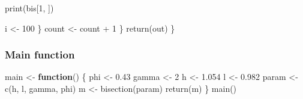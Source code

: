 \documentclass[
]{article}
\newenvironment{Shaded}{\begin{snugshade}}{\end{snugshade}}
\newcommand{\ControlFlowTok}[1]{\textcolor[rgb]{0.13,0.29,0.53}{\textbf{#1}}}
\newcommand{\DecValTok}[1]{\textcolor[rgb]{0.00,0.00,0.81}{#1}}
\newcommand{\FloatTok}[1]{\textcolor[rgb]{0.00,0.00,0.81}{#1}}
\newcommand{\FunctionTok}[1]{\textcolor[rgb]{0.00,0.00,0.00}{#1}}
\newcommand{\NormalTok}[1]{#1}
\newcommand{\OtherTok}[1]{\textcolor[rgb]{0.56,0.35,0.01}{#1}}
\newcommand{\SpecialCharTok}[1]{\textcolor[rgb]{0.00,0.00,0.00}{#1}}
\begin{document}
\begin{Shaded}
\begin{Highlighting}[]
        \FunctionTok{print}\NormalTok{(bis[}\DecValTok{1}\NormalTok{, ])}

\NormalTok{        i }\OtherTok{\textless{}{-}} \DecValTok{100}
\NormalTok{      \}}
\NormalTok{      count }\OtherTok{\textless{}{-}}\NormalTok{ count }\SpecialCharTok{+} \DecValTok{1}
\NormalTok{    \}}
    \FunctionTok{return}\NormalTok{(out)}
\NormalTok{\}}
\end{Highlighting}
\end{Shaded}

\hypertarget{main-function}{%
\subsubsection{Main function}\label{main-function}}

\begin{Shaded}
\begin{Highlighting}[]
\NormalTok{main }\OtherTok{\textless{}{-}} \ControlFlowTok{function}\NormalTok{() \{}
\NormalTok{  phi     }\OtherTok{\textless{}{-}} \FloatTok{0.43}
\NormalTok{  gamma   }\OtherTok{\textless{}{-}} \DecValTok{2}
\NormalTok{  h       }\OtherTok{\textless{}{-}} \FloatTok{1.054}
\NormalTok{  l       }\OtherTok{\textless{}{-}} \FloatTok{0.982}
\NormalTok{  param   }\OtherTok{\textless{}{-}} \FunctionTok{c}\NormalTok{(h, l, gamma, phi)}
\NormalTok{  m       }\OtherTok{\textless{}{-}} \FunctionTok{bisection}\NormalTok{(param)}
  \FunctionTok{return}\NormalTok{(m)}
\NormalTok{\}}
\FunctionTok{main}\NormalTok{()}
\end{Highlighting}
\end{Shaded}
\end{document}
